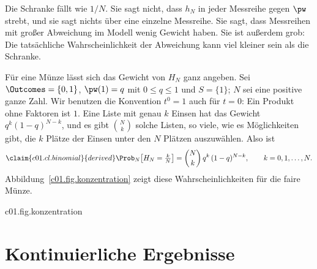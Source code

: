 \begin{vertiefung}
  Die Schranke fällt wie $1/N$. Sie sagt nicht, dass $h_N$ in jeder Messreihe gegen
  $\pw$ strebt, und sie sagt nichts über eine einzelne Messreihe. Sie sagt, dass
  Messreihen mit großer Abweichung im Modell wenig Gewicht haben. Sie ist außerdem grob:
  Die tatsächliche Wahrscheinlichkeit der Abweichung kann viel kleiner sein als die
  Schranke.

  Für eine Münze lässt sich das Gewicht von $H_N$ ganz angeben. Sei
  $\Outcomes = \{0, 1\}$, $\pw(1) = q$ mit $0 \leq q \leq 1$ und $S = \{1\}$; $N$ sei eine
  positive ganze Zahl. Wir benutzen die Konvention $t^0 = 1$ auch für $t = 0$: Ein
  Produkt ohne Faktoren ist $1$. Eine Liste mit genau $k$ Einsen hat
  das Gewicht $q^k (1-q)^{N-k}$, und es gibt $\binom{N}{k}$ solche Listen, so viele, wie
  es Möglichkeiten gibt, die $k$ Plätze der Einsen unter den $N$ Plätzen auszuwählen. Also
  ist
  \begin{equation}\label{c01.eq.binomial}\claim{c01.cl.binomial}{derived}
    \Prob_N\bigl[H_N = \tfrac{k}{N}\bigr] = \binom{N}{k}\, q^k\, (1-q)^{N-k},
    \qquad k = 0, 1, \dots, N .
  \end{equation}
  Abbildung~\ref{c01.fig.konzentration} zeigt diese Wahrscheinlichkeiten für die faire
  Münze.

  \begin{tpcfigure}{c01.fig.konzentration}
    \caption{Das Gewicht der relativen Häufigkeit $H_N$ von „Zahl“ bei einer fairen Münze,
      $q = \tfrac12$, nach Gleichung~\eqref{c01.eq.binomial} für $N = 4$, $16$ und $64$
      Würfe. Waagerecht steht der Wert $k/N$ von $H_N$; die Höhe eines Strichs ist seine
      Wahrscheinlichkeit, in jedem Bild in Einheiten des größten Werts. Die Klammer
      markiert die Werte mit $\abs{H_N - \tfrac12} < \tfrac14$. Mit wachsendem $N$
      sammelt sich das Gewicht in der Mitte.}
  \end{tpcfigure}
\end{vertiefung}

\section{Kontinuierliche Ergebnisse}\label{c01.s4}

